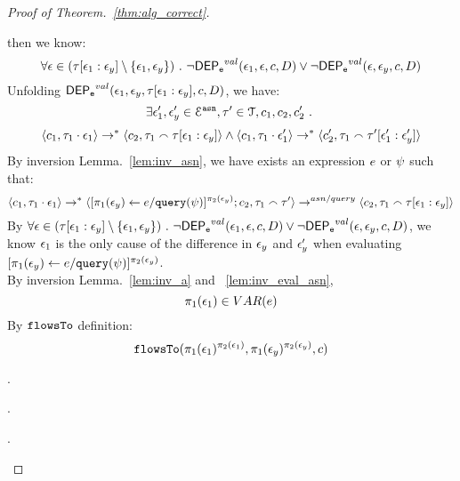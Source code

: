 \begin{proof}[Proof of Theorem.~\ref{thm:alg_correct}]
\begin{case}
\begin{subcase}
\begin{subsubcase}
then we know:
\[
  \forall \mathtt{\epsilon} \in (\mathtt{\tau}[\mathtt{\epsilon}_1:\mathtt{\epsilon}_y]\setminus \{\mathtt{\epsilon}_1, \mathtt{\epsilon}_y\}) ~.~
  \neg \mathsf{DEP_{\mathtt{e}}}^{val} (\mathtt{\epsilon}_1, \mathtt{\epsilon}, c, D) \lor \neg \mathsf{DEP_{\mathtt{e}}}^{val} (\mathtt{\epsilon}, \mathtt{\epsilon}_y, c, D)
\]
%
Unfolding $\mathsf{DEP_{\mathtt{e}}}^{val}(\mathtt{\epsilon}_1, \mathtt{\epsilon}_y, \mathtt{\tau}[\mathtt{\epsilon}_1:\mathtt{\epsilon}_y], c, D)$, we have:
\[
  \exists \mathtt{\epsilon}_1', \mathtt{\epsilon}_y' \in \mathcal{E}^{\mathtt{{asn}}},
  \mathtt{\tau}' \in \mathcal{T}, c_1, c_2, c_2' ~.~
\]
%
\[
\langle c_1, \mathtt{\tau}_1 \cdot \mathtt{\epsilon}_1 \rangle \rightarrow^{*} \langle c_2, \mathtt{\tau}_1 \smallfrown \mathtt{\tau}[\mathtt{\epsilon}_1:\mathtt{\epsilon}_y] \rangle 
\land
\langle c_1, \mathtt{\tau}_1 \cdot \mathtt{\epsilon}_1' \rangle \rightarrow^{*} \langle c_2', \mathtt{\tau}_1 \smallfrown \mathtt{\tau}'[\mathtt{\epsilon}_1':\mathtt{\epsilon}_y'] \rangle 
\]
%
%
By inversion Lemma.~\ref{lem:inv_asn}, we have exists an expression $e$ or $\psi$ such that:
\[
\langle c_1, \mathtt{\tau}_1 \cdot \mathtt{\epsilon}_1 \rangle \rightarrow^{*} \langle [\mathrel{ \pi_1(\mathtt{\epsilon}_y) \leftarrow e / {\tt query}(\psi) }]{}^{\pi_2(\mathtt{\epsilon}_y)};c_2, \mathtt{\tau}_1 \smallfrown \mathtt{\tau}' \rangle \rightarrow^{asn / query} \langle c_2, \mathtt{\tau}_1 \smallfrown \mathtt{\tau}[\mathtt{\epsilon}_1:\mathtt{\epsilon}_y] \rangle 
\]
%
By $\forall \mathtt{\epsilon} \in (\mathtt{\tau}[\mathtt{\epsilon}_1:\mathtt{\epsilon}_y]\setminus \{\mathtt{\epsilon}_1, \mathtt{\epsilon}_y\}) ~.~
  \neg \mathsf{DEP_{\mathtt{e}}}^{val} (\mathtt{\epsilon}_1, \mathtt{\epsilon}, c, D) \lor \neg \mathsf{DEP_{\mathtt{e}}}^{val} (\mathtt{\epsilon}, \mathtt{\epsilon}_y, c, D)$,
we know $\mathtt{\epsilon}_1$ is the only cause of the difference in $\mathtt{\epsilon}_y$ and $\mathtt{\epsilon}_y'$ when evaluating $[\mathrel{ \pi_1(\mathtt{\epsilon}_y) \leftarrow e / {\tt query}(\psi) }]{}^{\pi_2(\mathtt{\epsilon}_y)}$.
%
\\
By inversion Lemma.~\ref{lem:inv_a} and ~\ref{lem:inv_eval_asn}, 
\[
  \pi_1(\mathtt{\epsilon}_1) \in VAR(e)
\]
%
By $\mathtt{flowsTo}$ definition:
\[
  \mathtt{flowsTo}(\pi_1(\mathtt{\epsilon}_1)^{\pi_2(\mathtt{\epsilon}_1)}, \pi_1(\mathtt{\epsilon}_y)^{\pi_2(\mathtt{\epsilon}_y)}, c)
\]
%
\end{subsubcase}
%
\end{subcase}
%
%
\begin{subcase}.
%
\end{subcase}
%
\begin{subcase}.
%
\end{subcase}
%
\begin{subcase}.
%
\end{subcase}
%
\end{case}
%
\end{proof}